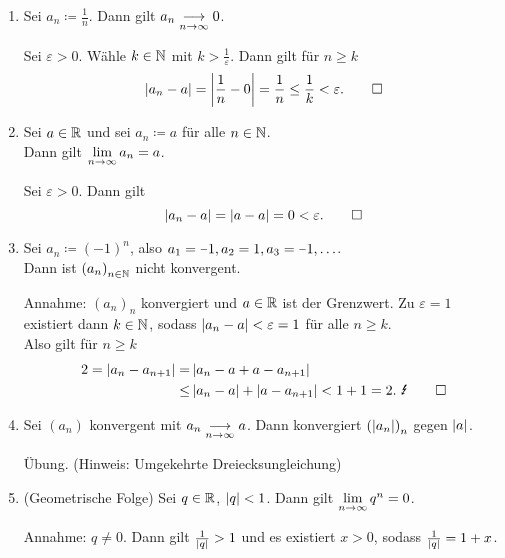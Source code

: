 \documentclass[../ana1.tex]{subfiles}
\begin{document}
\begin{bspe} \leavevmode
	\begin{enumerate}[(1)]
		\item Sei \(a_n \coloneqq \frac{1}{n} \). Dann gilt \( a_n \underset{n\rightarrow\infty}{\longrightarrow} 0 \).
			  \begin{bew}
				Sei \(\varepsilon > 0 \). Wähle \(k\in\mathbb{N} \) mit \(k>\frac{1}{\varepsilon} \).
				Dann gilt für \(n \geq k \)
				\[\left|a_n - a\right| = \left|\frac{1}{n} - 0\right| = \frac{1}{n} \leq \frac{1}{k} < \varepsilon. \qedhere \]
			  \end{bew}
		\item Sei \(a \in \mathbb{R} \) und sei \(a_n \coloneqq a \) für alle \(n \in \mathbb{N} \). \\
			  Dann gilt \(\lim\limits_{n\rightarrow\infty} a_n = a \).
			  \begin{bew}
				Sei \(\varepsilon > 0 \). Dann gilt
				\[\left|a_n - a\right| = \left|a-a\right| = 0 < \varepsilon. \qedhere \]
			  \end{bew}
		\item Sei \(a_n \coloneqq {(\minus 1)}^n \), also \(a_1 = \minus 1 \ko a_2 = 1 \ko a_3 = \minus 1 \ko \ldots \). \\
			  Dann ist \({(a_n)}_{n\in\mathbb{N}} \) nicht konvergent.
			  \begin{bew}
				Annahme: \({(a_n)}_n \) konvergiert und \(a \in \mathbb{R} \) ist der Grenzwert. Zu \(\varepsilon = 1 \) existiert dann \(k \in \mathbb{N} \), sodass
				\( \left|a_n - a\right| < \varepsilon = 1 \) für alle \(n \geq k \). \\
				Also gilt für \(n \geq k \)
				\begin{align*}
					2 = \abs{a_n - a_{n+1}} =& \abs{a_n - a + a - a_{n+1}} \\ 
									     \leq& \abs{a_n - a} + \abs{a-a_{n+1}} < 1 + 1 = 2. \text{ \Lightning} \qedhere
				\end{align*}
			  \end{bew}
		\item Sei \((a_n) \) konvergent mit \( a_n \underset{n\rightarrow\infty}{\longrightarrow} a \). Dann konvergiert \({(\left|a_n\right|)}_n \) gegen \(\left|a\right| \).
			  \begin{bew} \phantom{\qedhere}
				Übung. (Hinweis: Umgekehrte Dreiecksungleichung)
			  \end{bew}
		\item (Geometrische Folge)
			  Sei \(q \in \mathbb{R} \), \( \left|q\right| < 1 \). Dann gilt \(\lim\limits_{n\rightarrow\infty} q^n = 0 \).
			  \begin{bew}
				Annahme: \(q \neq 0 \). Dann gilt \(\frac{1}{\left|q\right|} > 1 \) und es existiert \(x > 0 \), sodass \(\frac{1}{\left|q\right|} = 1 + x \). \\

\end{bew}
\end{enumerate}
\end{bspe}
\end{document}
